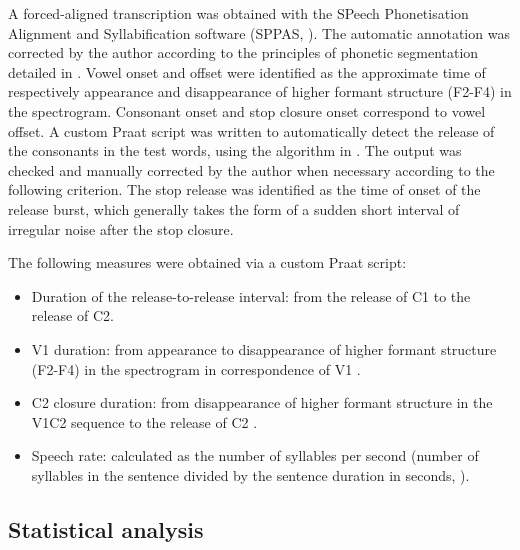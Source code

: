 \documentclass[12pt,a4paper,]{article}
\providecommand{\tightlist}{%
  \setlength{\itemsep}{0pt}\setlength{\parskip}{0pt}}
\begin{document}
A forced-aligned transcription was obtained with the SPeech
Phonetisation Alignment and Syllabification software (SPPAS,
\citealt{bigi2015}). The automatic annotation was corrected by the
author according to the principles of phonetic segmentation detailed in
\citet{machac2009}. Vowel onset and offset were identified as the
approximate time of respectively appearance and disappearance of higher
formant structure (F2-F4) in the spectrogram. Consonant onset and stop
closure onset correspond to vowel offset. A custom Praat script was
written to automatically detect the release of the consonants in the
test words, using the algorithm in \citet{ananthapadmanabha2014}. The
output was checked and manually corrected by the author when necessary
according to the following criterion. The stop release was identified as
the time of onset of the release burst, which generally takes the form
of a sudden short interval of irregular noise after the stop closure.

The following measures were obtained via a custom Praat script:

\begin{itemize}
\tightlist
\item
  Duration of the release-to-release interval: from the release of C1 to
  the release of C2.
\item
  V1 duration: from appearance to disappearance of higher formant
  structure (F2-F4) in the spectrogram in correspondence of V1
  \citep{machac2009}.
\item
  C2 closure duration: from disappearance of higher formant structure in
  the V1C2 sequence to the release of C2 \citep{machac2009}.
\item
  Speech rate: calculated as the number of syllables per second (number
  of syllables in the sentence divided by the sentence duration in
  seconds, \citealt{plug2018a}).
\end{itemize}

\hypertarget{statistical-analysis}{%
\subsection{Statistical analysis}\label{statistical-analysis}}

\label{s:bayes}
\end{document}
